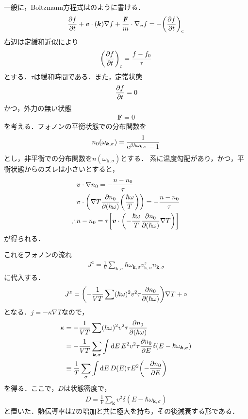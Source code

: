 \documentclass{report}
\begin{document}
一般に，Boltzmann方程式はのように書ける．
\begin{align}
  \pdv{f}{t} + \bm{v} \cdot (\bm{k})\nabla f + \frac{\bm{F}}{m} \cdot \nabla_{\bm{v}} f= - \qty(\pdv{f}{t})_{\mathrm{c}} \label{boltzmann}
\end{align}
右辺は定緩和近似により
\begin{align}
  \qty(\pdv{f}{t})_{\mathrm{c}} = \frac{f - f_0}{\tau}
\end{align}
とする．$\tau$は緩和時間である．また，定常状態
\begin{align}
  \pdv{f}{t} = 0
\end{align}
かつ，外力の無い状態
\begin{align}
  \bm{F} = 0
\end{align}
を考える．フォノンの平衡状態での分布関数を
\begin{align}
  n_0(\omega_{\bm{k},\sigma}) = \frac{1}{\mathrm{e}^{\beta\hbar\omega_{\bm{k},\sigma}} - 1}
\end{align}
とし，非平衡での分布関数を$n(\omega_{\bm{k},\sigma})$とする．
系に温度勾配があり，かつ，平衡状態からのズレは小さいとすると，
\begin{align}
  &\bm{v}\cdot \nabla n_0 = -\frac{n - n_0}{\tau}\\
  &\bm{v} \cdot \qty(\nabla T \pdv{n_0}{(\hbar \omega)}\qty(\frac{\hbar \omega}{T})) = -\frac{n - n_0}{\tau}\\
  \therefore &n - n_0 = \tau\qty[\bm{v} \cdot \qty(- \frac{\hbar \omega}{T} \pdv{n_0}{(\hbar \omega)} \nabla T)]\\
\end{align}
が得られる．

これをフォノンの流れ
\begin{align}
  J^z = \frac{1}{V} \sum_{\bm{k},\sigma} \hbar \omega_{\bm{k},\sigma} v_{\bm{k},\sigma}^z n_{\bm{k},\sigma}
\end{align}
に代入する．
\begin{align}
  J^z = \qty(-\frac{1}{VT} \sum (\hbar\omega)^2 v^2 \tau \pdv{n_0}{(\hbar\omega)}) \nabla T + \circ
\end{align}
となる．$j = - \kappa \nabla T$なので，
\begin{align}
  \kappa &= -\frac{1}{VT} \sum (\hbar\omega)^2 v^2 \tau \pdv{n_0}{(\hbar\omega)}\\
  &= -\frac{1}{VT} \sum_{\bm{k},\sigma} \int \dd{E} E^2 v^2 \tau \pdv{n_0}{E} \delta(E - \hbar\omega_{\bm{k},\sigma})\\
  &\equiv \frac{1}{T} \sum_{\sigma} \int \dd{E} D(E) \tau E^2 \qty(-\pdv{n_0}{E})
\end{align}
を得る．ここで，$D$は状態密度で，
\begin{align}
  D = \frac{1}{V} \sum_{\bm{k}} v^2 \delta(E - \hbar\omega_{\bm{k},\sigma})
\end{align}
と置いた．熱伝導率は$T$の増加と共に極大を持ち，その後減衰する形である．
\end{document}
